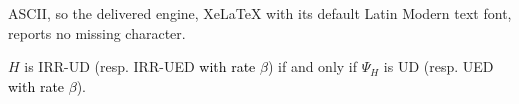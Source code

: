 \documentclass[10pt,a4paper]{amsart}
\begin{document}
ASCII, so the delivered engine, XeLaTeX with its default Latin Modern text font, reports no missing character.
  \begin{Lemma}
  \label{lem:lpv:IRR-UD}
  $H$ is IRR-UD (resp. IRR-UED \textcolor{black}{with rate $\beta$}) if and only if $\Psi_H$ is UD 
  (resp. UED \textcolor{black}{with rate $\beta$}). %
  \end{Lemma}
\end{document}
